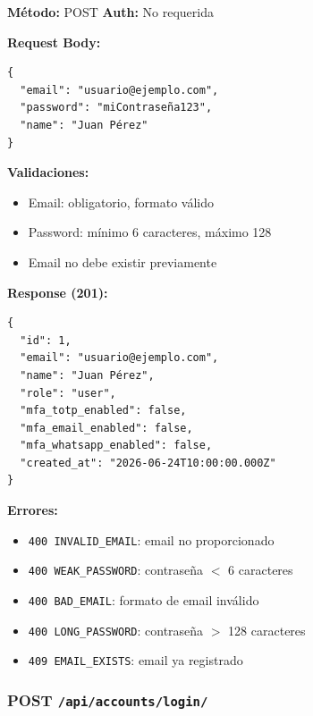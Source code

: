 \documentclass[12pt,a4paper,openany]{article}
\begin{document}
\begin{infobox}
\textbf{Método:} POST \quad \textbf{Auth:} No requerida

\textbf{Request Body:}
\begin{lstlisting}[style=jsstyle]
{
  "email": "usuario@ejemplo.com",
  "password": "miContraseña123",
  "name": "Juan Pérez"
}
\end{lstlisting}

\textbf{Validaciones:}
\begin{itemize}
    \item Email: obligatorio, formato válido
    \item Password: mínimo 6 caracteres, máximo 128
    \item Email no debe existir previamente
\end{itemize}

\textbf{Response (201):}
\begin{lstlisting}[style=jsstyle]
{
  "id": 1,
  "email": "usuario@ejemplo.com",
  "name": "Juan Pérez",
  "role": "user",
  "mfa_totp_enabled": false,
  "mfa_email_enabled": false,
  "mfa_whatsapp_enabled": false,
  "created_at": "2026-06-24T10:00:00.000Z"
}
\end{lstlisting}

\textbf{Errores:}
\begin{itemize}
    \item \texttt{400 INVALID\_EMAIL}: email no proporcionado
    \item \texttt{400 WEAK\_PASSWORD}: contraseña $<$ 6 caracteres
    \item \texttt{400 BAD\_EMAIL}: formato de email inválido
    \item \texttt{400 LONG\_PASSWORD}: contraseña $>$ 128 caracteres
    \item \texttt{409 EMAIL\_EXISTS}: email ya registrado
\end{itemize}
\end{infobox}

\subsubsection{POST \texttt{/api/accounts/login/}}
\end{document}

